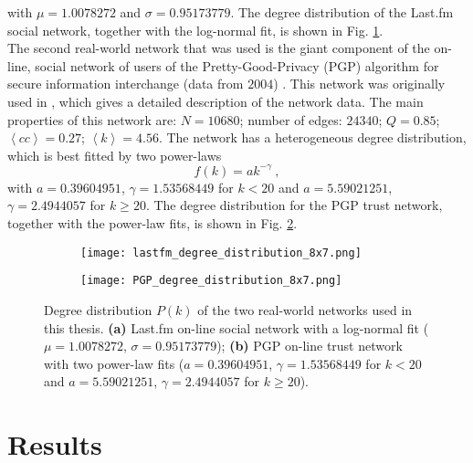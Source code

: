 \documentclass[11 pt , letterpaper , twoside , openright]{book}
\begin{document}
with $\mu = 1.0078272$ and $\sigma = 0.95173779$. The degree distribution of the Last.fm social network, together with the log-normal fit, is shown in Fig. \ref{deg_distr_lastfm}.\\
\newline
The second real-world network that was used is the giant component of the on-line, social network of users of the Pretty-Good-Privacy (PGP) algorithm for secure information interchange (data from $2004$) \cite{ICON}. This network was originally used in \cite{Boguna2004}, which gives a detailed description of the network data. The main properties of this network are: $N = 10680$; number of edges: $24340$; $Q = 0.85$; $\left<cc\right> = 0.27$; $\left<k\right> = 4.56$. The network has a heterogeneous degree distribution, which is best fitted by two power-laws
\begin{equation}
 f(k) = a k^{-\gamma} \ ,
\end{equation}
with $a = 0.39604951$, $\gamma = 1.53568449$ for $k < 20$ and $a = 5.59021251$, $\gamma = 2.4944057$ for $k \geqslant 20$. The degree distribution for the PGP trust network, together with the power-law fits, is shown in Fig. \ref{deg_distr_pgp}. 

\begin{figure}[H]
  \begin{subfigure}[b]{0.49\textwidth}
    \caption{}
    \texttt{[image: lastfm\_degree\_distribution\_8x7.png]}
    \label{deg_distr_lastfm}
  \end{subfigure}
  \begin{subfigure}[b]{0.49\textwidth}
    \caption{}
    \texttt{[image: PGP\_degree\_distribution\_8x7.png]}
    \label{deg_distr_pgp}
  \end{subfigure}
  \captionsetup{format=plain}
  \caption[Degree distribution $P(k)$ of the two real-world networks used in this thesis.]{Degree distribution $P(k)$ of the two real-world networks used in this thesis. \textbf{(a)} Last.fm on-line social network with a log-normal fit ($\mu = 1.0078272$, $\sigma = 0.95173779$); \textbf{(b)} PGP on-line trust network with two power-law fits ($a = 0.39604951$, $\gamma = 1.53568449$ for $k < 20$ and $a = 5.59021251$, $\gamma = 2.4944057$ for $k \geqslant 20$).}
\label{deg_distr_real_network}
\end{figure}

\chapter{Results}
\end{document}
